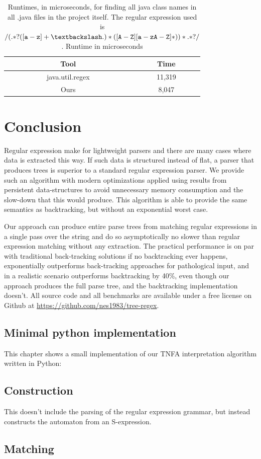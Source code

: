 \documentclass[11pt,a4paper,twoside,openright]{Thesis}
\theoremstyle{definition}
\newcommand{\regex}[1]{\ensuremath{\mathtt{/#1/}}}
\newcommand{\tablabel}[1]{\label{tab:#1}}
\begin{document}
\begin{table}[htp]\center
\begin{tabular}{cc}
\toprule
Tool & Time\tabularnewline
\midrule
java.util.regex & 11,319\tabularnewline
Ours & 8,047\tabularnewline
\bottomrule
\end{tabular}
\caption[Matching times for finding all java class names]{Runtimes, in microseconds, for finding all java class names in all
  .java files in the project itself. The regular expression used is
  \regex{(.*?([a-z]+\textbackslash.)*([A-Z][a-zA-Z]*))*.*?}.
Runtime in microseconds}
\tablabel{real}
\end{table}


\chapter{Conclusion}
Regular expression make for lightweight parsers and there are many cases
where data is extracted this way. If such data is structured
instead of flat, a parser that produces trees is superior to a standard
regular expression parser. We provide such an algorithm with modern
optimizations applied using results from persistent data-structures to avoid
unnecessary memory consumption and the slow-down that this would produce. 
This algorithm is able to provide the same semantics as backtracking, but 
without an exponential worst case.

Our approach can produce entire parse trees from matching regular expressions
in a single pass over the string and do so asymptotically no slower than
regular expression matching without any extraction.  The practical performance
is on par with traditional back-tracking solutions if no backtracking ever
happens, exponentially outperforms back-tracking approaches for pathological
input, and in a realistic scenario outperforms backtracking by 40\%, even
though our approach produces the full parse tree, and the backtracking
implementation doesn't. All source code and all benchmarks are available under
a free license on Github\cite{Schwarz:10861} at
\url{https://github.com/nes1983/tree-regex}.

\begin{appendices}
  \chapter{Minimal python implementation}

  This chapter shows a small implementation of our TNFA interpretation 
  algorithm written in Python:
  \section{Construction}
  This doesn't include the parsing of the regular expression grammar, but
  instead constructs the automaton from an S-expression.
  
  \section{Matching}\label{python-match}
  
\end{appendices}




\listoffigures
\listoftables
\listofalgorithms
{}
\end{document}
